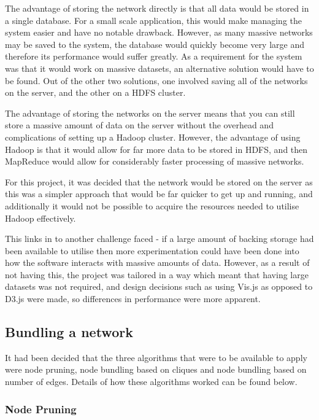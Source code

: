 \documentclass[../dissertation.tex]{subfiles}
\begin{document}
The advantage of storing the network directly is that all data would be stored in a single database. For a small scale application, this would make managing the system easier and have no notable drawback. However, as many massive networks may be saved to the system, the database would quickly become very large and therefore its performance would suffer greatly. As a requirement for the system was that it would work on massive datasets, an alternative solution would have to be found. Out of the other two solutions, one involved saving all of the networks on the server, and the other on a HDFS cluster. 

The advantage of storing the networks on the server means that you can still store a massive amount of data on the server without the overhead and complications of setting up a Hadoop cluster. However, the advantage of using Hadoop is that it would allow for far more data to be stored in HDFS, and then MapReduce would allow for considerably faster processing of massive networks.

For this project, it was decided that the network would be stored on the server as this was a simpler approach that would be far quicker to get up and running, and additionally it would not be possible to acquire the resources needed to utilise Hadoop effectively.

This links in to another challenge faced - if a large amount of backing storage had been available to utilise then more experimentation could have been done into how the software interacts with massive amounts of data. However, as a result of not having this, the project was tailored in a way which meant that having large datasets was not required, and design decisions such as using Vis.js as opposed to D3.js were made, so differences in performance were more apparent.

\subsection{Bundling a network}

It had been decided that the three algorithms that were to be available to apply were node pruning, node bundling based on cliques and node bundling based on number of edges. Details of how these algorithms worked can be found below.

\subsubsection{Node Pruning}
\label{sec:impl-node-prun}
\end{document}
